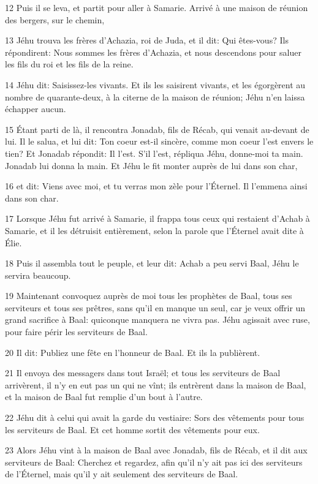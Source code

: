 \par 12 Puis il se leva, et partit pour aller à Samarie. Arrivé à une maison de réunion des bergers, sur le chemin,
\par 13 Jéhu trouva les frères d'Achazia, roi de Juda, et il dit: Qui êtes-vous? Ils répondirent: Nous sommes les frères d'Achazia, et nous descendons pour saluer les fils du roi et les fils de la reine.
\par 14 Jéhu dit: Saisissez-les vivants. Et ils les saisirent vivants, et les égorgèrent au nombre de quarante-deux, à la citerne de la maison de réunion; Jéhu n'en laissa échapper aucun.
\par 15 Étant parti de là, il rencontra Jonadab, fils de Récab, qui venait au-devant de lui. Il le salua, et lui dit: Ton coeur est-il sincère, comme mon coeur l'est envers le tien? Et Jonadab répondit: Il l'est. S'il l'est, répliqua Jéhu, donne-moi ta main. Jonadab lui donna la main. Et Jéhu le fit monter auprès de lui dans son char,
\par 16 et dit: Viens avec moi, et tu verras mon zèle pour l'Éternel. Il l'emmena ainsi dans son char.
\par 17 Lorsque Jéhu fut arrivé à Samarie, il frappa tous ceux qui restaient d'Achab à Samarie, et il les détruisit entièrement, selon la parole que l'Éternel avait dite à Élie.
\par 18 Puis il assembla tout le peuple, et leur dit: Achab a peu servi Baal, Jéhu le servira beaucoup.
\par 19 Maintenant convoquez auprès de moi tous les prophètes de Baal, tous ses serviteurs et tous ses prêtres, sans qu'il en manque un seul, car je veux offrir un grand sacrifice à Baal: quiconque manquera ne vivra pas. Jéhu agissait avec ruse, pour faire périr les serviteurs de Baal.
\par 20 Il dit: Publiez une fête en l'honneur de Baal. Et ils la publièrent.
\par 21 Il envoya des messagers dans tout Israël; et tous les serviteurs de Baal arrivèrent, il n'y en eut pas un qui ne vînt; ils entrèrent dans la maison de Baal, et la maison de Baal fut remplie d'un bout à l'autre.
\par 22 Jéhu dit à celui qui avait la garde du vestiaire: Sors des vêtements pour tous les serviteurs de Baal. Et cet homme sortit des vêtements pour eux.
\par 23 Alors Jéhu vint à la maison de Baal avec Jonadab, fils de Récab, et il dit aux serviteurs de Baal: Cherchez et regardez, afin qu'il n'y ait pas ici des serviteurs de l'Éternel, mais qu'il y ait seulement des serviteurs de Baal.
